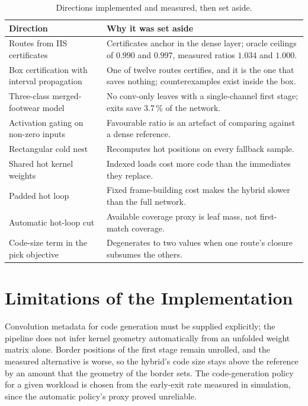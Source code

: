 \begin{table}[H]
	\centering
	\small
	\caption{Directions implemented and measured, then set aside.}
	\label{tab:impl-negative}
	\begin{tabularx}{\textwidth}{@{}>{\raggedright\arraybackslash}p{}X@{}}
		\toprule
		\textbf{Direction} & \textbf{Why it was set aside} \\
		\midrule
		Routes from \ac{IIS} certificates & Certificates anchor in the dense layer; oracle ceilings of \(0.990\) and \(0.997\), measured ratios \(1.034\) and \(1.000\). \\
		Box certification with interval propagation & One of twelve routes certifies, and it is the one that saves nothing; counterexamples exist inside the box. \\
		Three-class merged-footwear model & No conv-only leaves with a single-channel first stage; exits save 3.7\,\% of the network. \\
		Activation gating on non-zero inputs & Favourable ratio is an artefact of comparing against a dense reference. \\
		Rectangular cold nest & Recomputes hot positions on every fallback sample. \\
		Shared hot kernel weights & Indexed loads cost more code than the immediates they replace. \\
		Padded hot loop & Fixed frame-building cost makes the hybrid slower than the full network. \\
		Automatic hot-loop cut & Available coverage proxy is leaf mass, not first-match coverage. \\
		Code-size term in the pick objective & Degenerates to two values when one route's closure subsumes the others. \\
		\bottomrule
	\end{tabularx}
\end{table}


\section{Limitations of the Implementation}
\label{sec:impl-limits}

Convolution metadata for code generation must be supplied explicitly; the pipeline does not infer kernel geometry automatically from an unfolded weight matrix alone.
Border positions of the first stage remain unrolled, and the measured alternative is worse, so the hybrid's code size stays above the reference by an amount that the geometry of the border sets.
The code-generation policy for a given workload is chosen from the early-exit rate measured in simulation, since the automatic policy's proxy proved unreliable.

